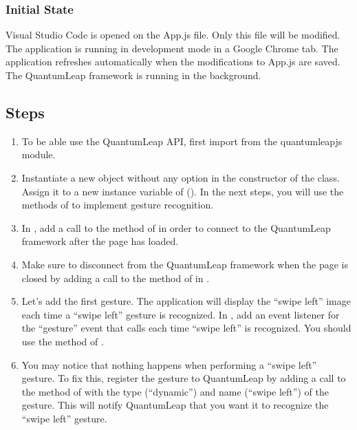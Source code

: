 \subsubsection{Initial State}
Visual Studio Code is opened on the \textsf{App.js} file. Only this file will be modified. The application is running in development mode in a Google Chrome tab. The application refreshes automatically when the modifications to \textsf{App.js} are saved. The QuantumLeap framework is running in the background.

\subsection{Steps}
\begin{enumerate}
    \item To be able use the QuantumLeap API, first import  from the quantumleapjs module.
    \item Instantiate a new  object without any option in the constructor of the  class. Assign it to a new instance variable of  (\eg {}). In the next steps, you will use the methods of  to implement gesture recognition.
    \item In , add a call to the  method of  in order to connect to the QuantumLeap framework after the page has loaded.
    \item Make sure to disconnect from the QuantumLeap framework when the page is closed by adding a call to the  method of  in .
    \item Let's add the first gesture. The application will display the ``swipe left'' image each time a ``swipe left'' gesture is recognized. In , add an event listener for the ``gesture'' event that calls  each time ``swipe left'' is recognized. You should use the  method of .
    \item You may notice that nothing happens when performing a ``swipe left'' gesture. To fix this, register the gesture to QuantumLeap by adding a call to the  method of  with the type (``dynamic'') and name (``swipe left'') of the gesture. This will notify QuantumLeap that you want it to recognize the ``swipe left'' gesture.

\end{enumerate}
